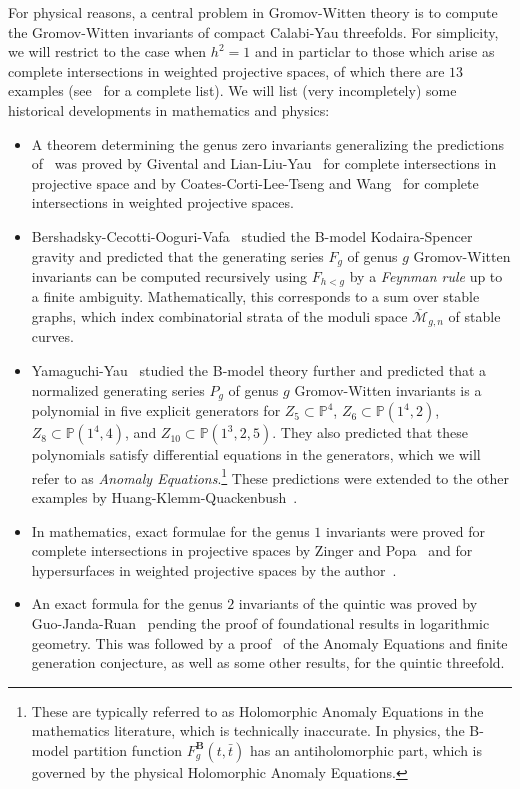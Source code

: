 \documentclass[10pt]{amsart}
\theoremstyle{definition}
\theoremstyle{remark}
\theoremstyle{plain}
\theoremstyle{definition}
\theoremstyle{remark}
\newcommand{\bB}{\mathbf{B}}
\renewcommand{\P}{\mathbb{P}}
\newcommand{\msc}[1]{\mathscr{#1}}
\newcommand{\ol}[1]{\overline{#1}}
\newcommand{\1}{\mathbf{1}}
\newcommand{\2}{\mathbf{2}}
\newcommand{\3}{\mathbf{3}}
\numberwithin{equation}{section}
\begin{document}
For physical reasons, a central problem in Gromov-Witten theory is to compute the Gromov-Witten invariants of compact Calabi-Yau threefolds. For simplicity, we will restrict to the case when $h^2 = 1$ and in particlar to those which arise as complete intersections in weighted projective spaces, of which there are $13$ examples (see~\cite[\S 4]{hkq} for a complete list). We will list (very incompletely) some historical developments in mathematics and physics:
\begin{itemize}
    \item A theorem determining the genus zero invariants generalizing the predictions of~\cite{cdgp} was proved by Givental and Lian-Liu-Yau~\cite{eqgwinv,lly} for complete intersections in projective space and by Coates-Corti-Lee-Tseng and Wang~\cite{orbqcohwproj,mirrornonconvex} for complete intersections in weighted projective spaces.
    \item Bershadsky-Cecotti-Ooguri-Vafa~\cite{bcov} studied the B-model Kodaira-Spencer gravity and predicted that the generating series $F_g$ of genus $g$ Gromov-Witten invariants can be computed recursively using $F_{h<g}$ by a \textit{Feynman rule} up to a finite ambiguity. Mathematically, this corresponds to a sum over stable graphs, which index combinatorial strata of the moduli space $\ol{\msc{M}}_{g,n}$ of stable curves.
    \item Yamaguchi-Yau~\cite{yy04} studied the B-model theory further and predicted that a normalized generating series $P_g$ of genus $g$ Gromov-Witten invariants is a polynomial in five explicit generators for $Z_5 \subset \P^4$, $Z_6 \subset \P(1^4,2)$, $Z_8 \subset \P(1^4,4)$, and $Z_{10} \subset \P(1^3,2,5)$. They also predicted that these polynomials satisfy differential equations in the generators, which we will refer to as \textit{Anomaly Equations}.\footnote{These are typically referred to as Holomorphic Anomaly Equations in the mathematics literature, which is technically inaccurate. In physics, the B-model partition function $F_g^{\bB}(t, \bar{t})$ has an antiholomorphic part, which is governed by the physical Holomorphic Anomaly Equations.} These predictions were extended to the other examples by Huang-Klemm-Quackenbush~\cite{hkq}.
    \item In mathematics, exact formulae for the genus $1$ invariants were proved for complete intersections in projective spaces  by Zinger and Popa~\cite{reducedgenus1,popagenus1ci} and for hypersurfaces in weighted projective spaces by the author~\cite{polynomiality}.
    \item An exact formula for the genus $2$ invariants of the quintic was proved by Guo-Janda-Ruan~\cite{genus2logglsm} pending the proof of foundational results in logarithmic geometry. This was followed by a proof~\cite{bcovlogglsm} of the Anomaly Equations and finite generation conjecture, as well as some other results, for the quintic threefold.

\end{itemize}
\end{document}
